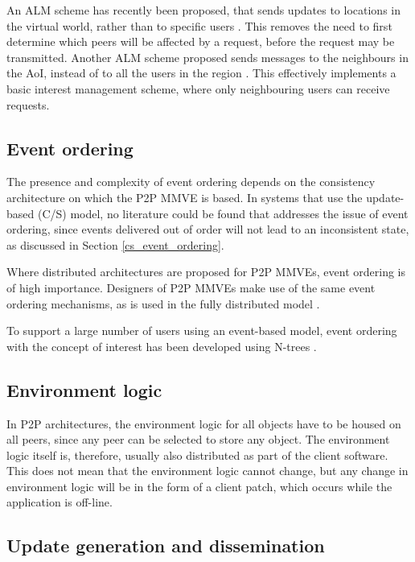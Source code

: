 An ALM scheme has recently been proposed, that sends updates to locations in the virtual world, rather than to specific users \cite{Ghaffari_Delaunay_churn_mobility}. This removes the need to first determine which peers will be affected by a request, before the request may be transmitted. Another ALM scheme proposed sends messages to the neighbours in the AoI, instead of to all the users in the region \cite{Seeger_area_based_gossip_multicast}. This effectively implements a basic interest management scheme, where only neighbouring users can receive requests.

\subsection{Event ordering}

The presence and complexity of event ordering depends on the consistency architecture on which the P2P MMVE is based. In systems that use the update-based (C/S) model, no literature could be found that addresses the issue of event ordering, since events delivered out of order will not lead to an inconsistent state, as discussed in Section \ref{cs_event_ordering}.

Where distributed architectures are proposed for P2P MMVEs, event ordering is of high importance. Designers of P2P MMVEs make use of the same event ordering mechanisms, as is used in the fully distributed model \cite{hybrid_storage1}.

To support a large number of users using an event-based model, event ordering with the concept of interest has been developed using N-trees \cite{GauthierDickey_ntrees}.

\subsection{Environment logic}

In P2P architectures, the environment logic for all objects have to be housed on all peers, since any peer can be selected to store any object. The environment logic itself is, therefore, usually also distributed as part of the client software. This does not mean that the environment logic cannot change, but any change in environment logic will be in the form of a client patch, which occurs while the application is off-line.

\subsection{Update generation and dissemination}

